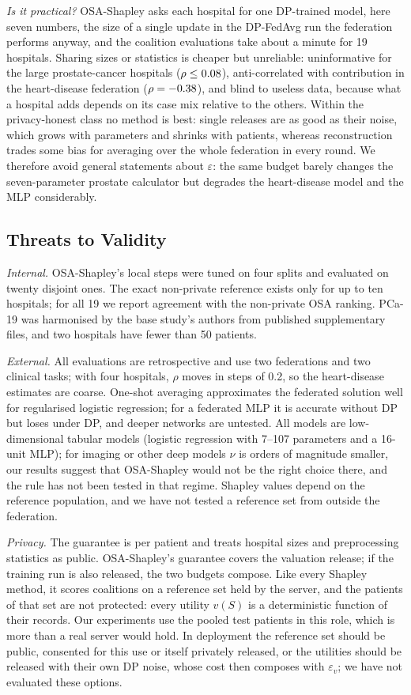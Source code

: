 \documentclass[journal]{IEEEtran}
\begin{document}
\emph{Is it practical?} OSA-Shapley asks each hospital for one DP-trained model, here seven numbers, the size of a single update in the DP-FedAvg run the federation performs anyway, and the coalition evaluations take about a minute for 19 hospitals. Sharing sizes or statistics is cheaper but unreliable: uninformative for the large prostate-cancer hospitals ($\rho\le0.08$), anti-correlated with contribution in the heart-disease federation ($\rho=-0.38$), and blind to useless data, because what a hospital adds depends on its case mix relative to the others. Within the privacy-honest class no method is best: single releases are as good as their noise, which grows with parameters and shrinks with patients, whereas reconstruction trades some bias for averaging over the whole federation in every round. We therefore avoid general statements about $\varepsilon$: the same budget barely changes the seven-parameter prostate calculator but degrades the heart-disease model and the MLP considerably.

\subsection{Threats to Validity}
\emph{Internal.} OSA-Shapley's local steps were tuned on four splits and evaluated on twenty disjoint ones. The exact non-private reference exists only for up to ten hospitals; for all 19 we report agreement with the non-private OSA ranking. PCa-19 was harmonised by the base study's authors from published supplementary files, and two hospitals have fewer than 50 patients.

\emph{External.} All evaluations are retrospective and use two federations and two clinical tasks; with four hospitals, $\rho$ moves in steps of 0.2, so the heart-disease estimates are coarse. One-shot averaging approximates the federated solution well for regularised logistic regression; for a federated MLP it is accurate without DP but loses under DP, and deeper networks are untested. All models are low-dimensional tabular models (logistic regression with 7--107 parameters and a 16-unit MLP); for imaging or other deep models $\nu$ is orders of magnitude smaller, our results suggest that OSA-Shapley would not be the right choice there, and the rule has not been tested in that regime. Shapley values depend on the reference population, and we have not tested a reference set from outside the federation.

\emph{Privacy.} The guarantee is per patient and treats hospital sizes and preprocessing statistics as public. OSA-Shapley's guarantee covers the valuation release; if the training run is also released, the two budgets compose. Like every Shapley method, it scores coalitions on a reference set held by the server, and the patients of that set are not protected: every utility $v(S)$ is a deterministic function of their records. Our experiments use the pooled test patients in this role, which is more than a real server would hold. In deployment the reference set should be public, consented for this use or itself privately released, or the utilities should be released with their own DP noise, whose cost then composes with $\varepsilon_v$; we have not evaluated these options.
\end{document}
